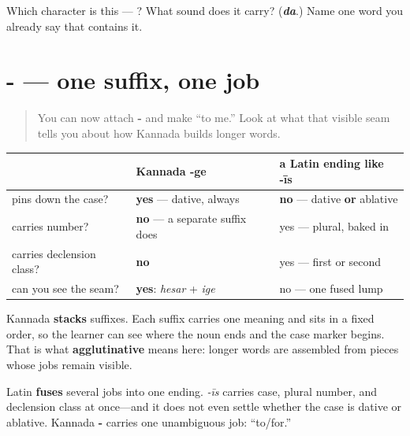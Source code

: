 \begin{tcolorbox}[breakable,colback=teal!4,colframe=teal!35!black,title={Before you move on}]
Which character is this — ? What sound does it carry? (\emph{\textbf{da}}.) Name one word you already say that contains it.
\end{tcolorbox}
\section[\texorpdfstring{-\kn{ಗೆ} — stacking (-ge)}{-ಗೆ — stacking (-ge)}]{- — one suffix, one job}

\label{lesson:KA-C06-dative-stacking}



\begin{quote}
You can now attach \textbf{-} and make \textbf{} “to me.” Look at what that visible seam tells you about how Kannada builds longer words.
\end{quote}

\begin{grammarlens}[title={Grammar Lens: Stacking versus fusion}]
\noindent
\begin{tabularx}{\linewidth}{@{}>{\raggedright\arraybackslash}X>{\raggedright\arraybackslash}X>{\raggedright\arraybackslash}X@{}}
\toprule
\textbf{} & \textbf{Kannada \textbf{-ge}} & \textbf{a Latin ending like \textbf{-īs}} \\
\midrule
pins down the case? & \textbf{yes} — dative, always & \textbf{no} — dative \textbf{or} ablative \\
carries number? & \textbf{no} — a separate suffix does & yes — plural, baked in \\
carries declension class? & \textbf{no} & yes — first or second \\
can you see the seam? & \textbf{yes}: \emph{hesar} + \emph{ige} & no — one fused lump \\
\bottomrule
\end{tabularx}

Kannada \textbf{stacks} suffixes. Each suffix carries one meaning and sits in a fixed order, so the learner can see where the noun ends and the case marker begins. That is what \textbf{agglutinative} means here: longer words are assembled from pieces whose jobs remain visible.

Latin \textbf{fuses} several jobs into one ending. \emph{-īs} carries case, plural number, and declension class at once—and it does not even settle whether the case is dative or ablative. Kannada \textbf{-} carries one unambiguous job: “to/for.”
\end{grammarlens}


